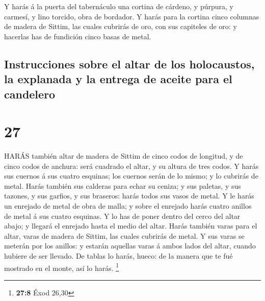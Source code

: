  Y harás á la puerta del tabernáculo una cortina de
cárdeno, y púrpura, y carmesí, y lino torcido, obra de bordador.
 Y harás para la cortina cinco columnas de madera de
Sittim, las cuales cubrirás de oro, con sus capiteles de oro: y hacerlas
has de fundición cinco basas de metal.

\hypertarget{instrucciones-sobre-el-altar-de-los-holocaustos-la-explanada-y-la-entrega-de-aceite-para-el-candelero}{%
\subsection{Instrucciones sobre el altar de los holocaustos, la
explanada y la entrega de aceite para el
candelero}\label{instrucciones-sobre-el-altar-de-los-holocaustos-la-explanada-y-la-entrega-de-aceite-para-el-candelero}}

\hypertarget{section-26}{%
\section{27}\label{section-26}}

 HARÁS también altar de madera de Sittim de cinco codos de
longitud, y de cinco codos de anchura: será cuadrado el altar, y su
altura de tres codos.  Y harás sus cuernos á sus cuatro
esquinas; los cuernos serán de lo mismo; y lo cubrirás de metal.
 Harás también sus calderas para echar su ceniza; y sus
paletas, y sus tazones, y sus garfios, y sus braseros: harás todos sus
vasos de metal.  Y le harás un enrejado de metal de obra de
malla; y sobre el enrejado harás cuatro anillos de metal á sus cuatro
esquinas.  Y lo has de poner dentro del cerco del altar
abajo; y llegará el enrejado hasta el medio del altar. 
Harás también varas para el altar, varas de madera de Sittim, las cuales
cubrirás de metal.  Y sus varas se meterán por los anillos:
y estarán aquellas varas á ambos lados del altar, cuando hubiere de ser
llevado.  De tablas lo harás, hueco: de la manera que te fué
mostrado en el monte, así lo harás. \footnote{\textbf{27:8} Éxod 26,30}

